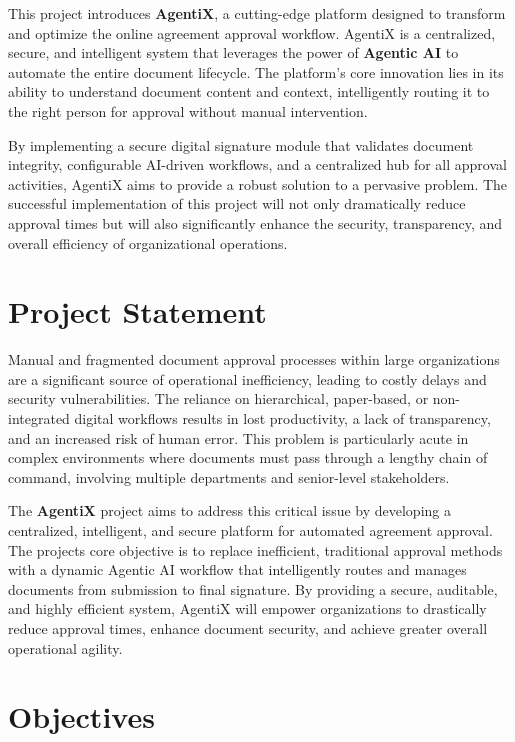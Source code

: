 \documentclass[12pt,oneside,openright,a4paper]{cpe-english-project}
\begin{document}
This project introduces \textbf{AgentiX}, a cutting-edge platform designed to transform and optimize the online agreement approval workflow. AgentiX is a centralized, secure, and intelligent system that leverages the power of \textbf{Agentic AI} to automate the entire document lifecycle. The platform's core innovation lies in its ability to understand document content and context, intelligently routing it to the right person for approval without manual intervention.

By implementing a secure digital signature module that validates document integrity, configurable AI-driven workflows, and a centralized hub for all approval activities, AgentiX aims to provide a robust solution to a pervasive problem. The successful implementation of this project will not only dramatically reduce approval times but will also significantly enhance the security, transparency, and overall efficiency of organizational operations.

\section{Project Statement}

Manual and fragmented document approval processes within large
organizations are a significant source of operational inefficiency,
leading to costly delays and security vulnerabilities. The reliance on
hierarchical, paper-based, or non-integrated digital workflows results
in lost productivity, a lack of transparency, and an increased risk of
human error. This problem is particularly acute in complex environments
where documents must pass through a lengthy chain of command, involving
multiple departments and senior-level stakeholders.

The \textbf{AgentiX} project aims to address this critical issue by
developing a centralized, intelligent, and secure platform for automated
agreement approval. The project\textquotesingle s core objective is to
replace inefficient, traditional approval methods with a dynamic Agentic
AI workflow that intelligently routes and manages documents from
submission to final signature. By providing a secure, auditable, and
highly efficient system, AgentiX will empower organizations to
drastically reduce approval times, enhance document security, and
achieve greater overall operational agility.

\section{Objectives}
\end{document}
